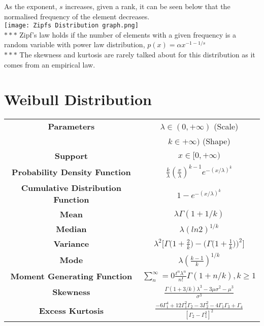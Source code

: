 \documentclass[14pt, a4paper]{article}
\theoremstyle{definition}
\begin{document}
As the exponent, $s$ increases, given a rank, it can be seen below that the normalised frequency of the element decreases. 
\\ \texttt{[image: Zipfs Distribution graph.png]}
\\ $***$ Zipf's law holds if the number of elements with a given frequency is a random variable with power law distribution, $p(x) = \alpha x^{-1 -1/s}$
\\ $***$ The skewness and kurtosis are rarely talked about for this distribution as it comes from an empirical law.
\section{Weibull Distribution}

\begin{center}
    \begin{tabular}{|c|c|}  %
\hline
 \textbf{Parameters }& $\lambda \in (0,+\infty)$ (Scale) \\ & $k \in +\infty)$ (Shape) \\
 \hline
 \textbf{Support} & $x\in [0,+\infty)$ \\
 \hline
 \textbf{Probability Density Function} & 
 $ \frac{k}{\lambda} (\frac{x}{\lambda})^{k-1} e^{-(x/\lambda)^k}$
 \\
 \hline
 \textbf{Cumulative Distribution Function} &  $1 - e^{-(x/\lambda)^k}$ \\
 \hline
 \textbf{Mean} & $\lambda \Gamma(1 + 1/k)$ \\
 \hline
 \textbf{Median} & $\lambda (ln 2)^{1/k}$ \\
 \hline
 \textbf{Variance} & $\lambda^2 \Big[ \Gamma \Big( 1 + \frac{2}{k} \Big) - \Big( \Gamma \Big( 1 + \frac{1}{k} \Big) \Big)^2 \Big]$ \\
 \hline
 \textbf{Mode} & $\lambda (\frac{k-1}{k})^{1/k}$ \\
 \hline
 \textbf{Moment Generating Function} & $\sum^\infty_n = 0 \frac{t^n \lambda^n}{n!} \Gamma(1 + n/k), k\geq 1$  \\
 \hline
 \textbf{Skewness} & $\frac{\Gamma(1+3/k) \lambda^3 - 3 \mu \sigma^2 - \mu^3}{\sigma^3}$ \\
 \hline
 \textbf{Excess Kurtosis} & $\frac{-6 \Gamma^4_1 + 12 \Gamma^2_1 \Gamma_2 - 3 \Gamma^2_2 - 4 \Gamma_1 \Gamma_3 + \Gamma_4}{[ \Gamma_2 - \Gamma^2_1]^2}$ \\
 \hline
       
  \end{tabular}
\end{center}
\end{document}
